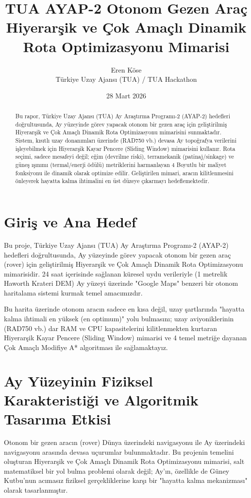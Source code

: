 \documentclass[12pt,a4paper]{article}
\title{\textbf{TUA AYAP-2 Otonom Gezen Araç}\\ \Large Hiyerarşik ve Çok Amaçlı Dinamik Rota Optimizasyonu Mimarisi}
\author{Eren Köse\\ \normalsize Türkiye Uzay Ajansı (TUA) / TUA Hackathon}
\date{28 Mart 2026}
\begin{document}
\shorthandoff{=}

\maketitle

\begin{abstract}
Bu rapor, Türkiye Uzay Ajansı (TUA) Ay Araştırma Programı-2 (AYAP-2) hedefleri doğrultusunda, Ay yüzeyinde görev yapacak otonom bir gezen araç için geliştirilmiş Hiyerarşik ve Çok Amaçlı Dinamik Rota Optimizasyonu mimarisini sunmaktadır. Sistem, kısıtlı uzay donanımları üzerinde (RAD750 vb.) devasa Ay topoğrafya verilerini işleyebilmek için Hiyerarşik Kayar Pencere (Sliding Window) mimarisini kullanır. Rota seçimi, sadece mesafeyi değil; eğim (devrilme riski), terramekanik (patinaj/sinkage) ve güneş ışınımı (termal/enerji ödülü) metriklerini harmanlayan 4 Boyutlu bir maliyet fonksiyonu ile dinamik olarak optimize edilir. Geliştirilen mimari, aracın kilitlenmesini önleyerek hayatta kalma ihtimalini en üst düzeye çıkarmayı hedeflemektedir.
\end{abstract}

\newpage

\section{Giriş ve Ana Hedef}
Bu proje, Türkiye Uzay Ajansı (TUA) Ay Araştırma Programı-2 (AYAP-2) hedefleri doğrultusunda, Ay yüzeyinde görev yapacak otonom bir gezen araç (rover) için geliştirilmiş Hiyerarşik ve Çok Amaçlı Dinamik Rota Optimizasyonu mimarisidir. 24 saat içerisinde sağlanan küresel uydu verileriyle (1 metrelik Haworth Krateri DEM) Ay yüzeyi üzerinde "Google Maps" benzeri bir otonom haritalama sistemi kurmak temel amacımızdır.

Bu harita üzerinde otonom aracın sadece en kısa değil, uzay şartlarında "hayatta kalma ihtimali en yüksek (en optimum)" yolu bulmasını; uzay aviyoniklerinin (RAD750 vb.) dar RAM ve CPU kapasitelerini kilitlenmekten kurtaran Hiyerarşik Kayar Pencere (Sliding Window) mimarisi ve 4 temel metriğe dayanan Çok Amaçlı Modifiye A* algoritması ile sağlamaktayız.
\section{Ay Yüzeyinin Fiziksel Karakteristiği ve Algoritmik Tasarıma Etkisi}
Otonom bir gezen aracın (rover) Dünya üzerindeki navigasyonu ile Ay üzerindeki navigasyonu arasında devasa uçurumlar bulunmaktadır. Bu projenin temelini oluşturan Hiyerarşik ve Çok Amaçlı Dinamik Rota Optimizasyonu mimarisi, salt matematiksel bir yol bulma problemi olarak değil; Ay'ın, özellikle de Güney Kutbu'nun acımasız fiziksel gerçekliklerine karşı bir "hayatta kalma mekanizması" olarak tasarlanmıştır.
\end{document}
